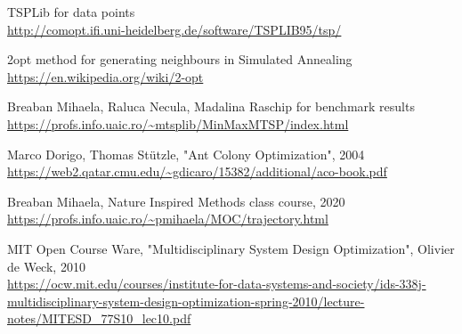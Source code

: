 \documentclass{article}
\begin{document}

\begin{thebibliography}{9}
\bibitem{} 
TSPLib for data points
\\\url{http://comopt.ifi.uni-heidelberg.de/software/TSPLIB95/tsp/}

\bibitem{} 
2opt method for generating neighbours in Simulated Annealing
\\\url{https://en.wikipedia.org/wiki/2-opt}

\bibitem{} 
Breaban Mihaela, Raluca Necula, Madalina Raschip for benchmark results
\\\url{https://profs.info.uaic.ro/~mtsplib/MinMaxMTSP/index.html}

\bibitem{} 
Marco Dorigo, Thomas Stützle, "Ant Colony Optimization", 2004
\\\url{https://web2.qatar.cmu.edu/~gdicaro/15382/additional/aco-book.pdf}

\bibitem{} 
Breaban Mihaela, Nature Inspired Methods class course, 2020
\\\url{https://profs.info.uaic.ro/~pmihaela/MOC/trajectory.html}

\bibitem{} 
MIT Open Course Ware, "Multidisciplinary System Design Optimization", Olivier de Weck, 2010
\\\url{https://ocw.mit.edu/courses/institute-for-data-systems-and-society/ids-338j-multidisciplinary-system-design-optimization-spring-2010/lecture-notes/MITESD_77S10_lec10.pdf}

\end{thebibliography}
\end{document}
